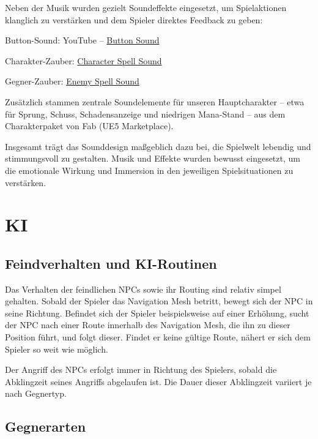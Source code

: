 \documentclass[oneside]{ausarbeitung}
\begin{document}
Neben der Musik wurden gezielt Soundeffekte eingesetzt, um Spielaktionen klanglich zu verstärken und dem Spieler direktes Feedback zu geben:

Button-Sound: YouTube – \href{https://www.youtube.com/watch?v=h8y0JMVwdmM&ab_channel=SoundLibrary}{Button Sound}

Charakter-Zauber: \href{https://www.youtube.com/watch?v=SJNZDvpGBG8&list=PLpyrFKkVGmcQSYKqGl8Z_dCLQvvtbPMKf&index=13&ab_channel=SoundEffectsSoundCuration}{Character Spell Sound} 

Gegner-Zauber: \href{https://www.youtube.com/watch?v=-f2rxR2GC8s&list=PLpyrFKkVGmcQSYKqGl8Z_dCLQvvtbPMKf&index=9&ab_channel=SoundEffectsSoundCuration}{Enemy Spell Sound}

Zusätzlich stammen zentrale Soundelemente für unseren Hauptcharakter – etwa für Sprung, Schuss, Schadensanzeige und niedrigen Mana-Stand – aus dem Charakterpaket von Fab (UE5 Marketplace).

Insgesamt trägt das Sounddesign maßgeblich dazu bei, die Spielwelt lebendig und stimmungsvoll zu gestalten. Musik und Effekte wurden bewusst eingesetzt, um die emotionale Wirkung und Immersion in den jeweiligen Spielsituationen zu verstärken.


\chapter{KI}
\label{cha:ki}

\section{Feindverhalten und KI-Routinen}
\label{sec:feindverhaltenundki-routinen}

Das Verhalten der feindlichen NPCs sowie ihr Routing sind relativ simpel gehalten.
Sobald der Spieler das Navigation Mesh betritt, bewegt sich der NPC in seine Richtung.
Befindet sich der Spieler beispielsweise auf einer Erhöhung, sucht der NPC nach einer Route innerhalb des Navigation Mesh, die ihn zu dieser Position führt, und folgt dieser.
Findet er keine gültige Route, nähert er sich dem Spieler so weit wie möglich.

Der Angriff des NPCs erfolgt immer in Richtung des Spielers, sobald die Abklingzeit seines Angriffs abgelaufen ist. Die Dauer dieser Abklingzeit variiert je nach Gegnertyp. 

\section{Gegnerarten}
\label{sec:gegnerarten}
\end{document}
